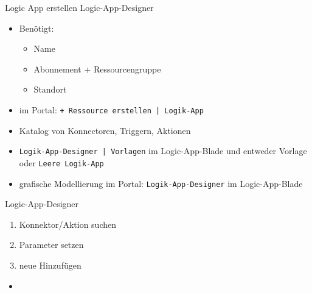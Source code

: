 \begin{flashcard}[Definition]{Logic App erstellen}
    Logic-App-Designer
    \begin{itemize}
        \item Benötigt:
            \begin{itemize}
                \item Name
                \item Abonnement + Ressourcengruppe
                \item Standort
            \end{itemize}
        \item im Portal: \texttt{+ Ressource erstellen | Logik-App}\newline
        \item Katalog von Konnectoren, Triggern, Aktionen
        \item \texttt{Logik-App-Designer | Vorlagen} im Logic-App-Blade und entweder Vorlage oder \texttt{Leere Logik-App}
        \item grafische Modellierung im Portal: \texttt{Logik-App-Designer} im Logic-App-Blade
    \end{itemize}
\end{flashcard}

\begin{flashcard}[Definition]{Logic-App-Designer}
    \begin{enumerate}
        \item Konnektor/Aktion suchen
        \item Parameter setzen
        \item neue Hinzufügen
    \end{enumerate}
\end{flashcard}

\begin{flashcard}[Definition]{}
    \begin{itemize}
        \item
    \end{itemize}
\end{flashcard}

